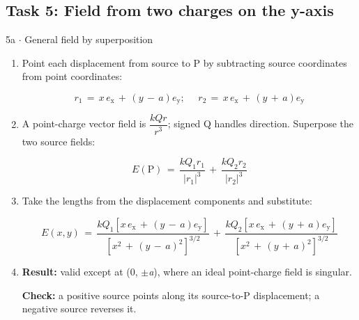 \documentclass[11pt]{article}
\begin{document}
\begin{keepsection}\subsection{Task 5: Field from two charges on the y-axis}

\begin{workedbox}{5a \ensuremath{\cdot} General field by superposition}
\begin{enumerate}
\item {}
Point each displacement from source to P by subtracting source coordinates from point coordinates:

\begin{equation*}{r}_{1}\, =\, {x\,e}_{\mathrm{x}}\, +\, ({y}\, -\, {a}){e}_{\mathrm{y}};\, \quad \, {r}_{2}\, =\, {x\,e}_{\mathrm{x}}\, +\, ({y}\, +\, {a}){e}_{\mathrm{y}}\end{equation*}
\item {}
A point-charge vector field is {\small\ensuremath{\dfrac{{kQ}{r}}{{r}^{3}}}}; signed Q handles direction. Superpose the two source fields:

\begin{equation*}{E}(\mathrm{P})\, =\, \dfrac{{kQ}_{1}{r}_{1}}{|{r}_{1}|^{3}}\, +\, \dfrac{{kQ}_{2}{r}_{2}}{|{r}_{2}|^{3}}\end{equation*}
\item {}
Take the lengths from the displacement components and substitute:

\begin{equation*}{E}({x},{y})\, =\, \dfrac{{kQ}_{1}[{x\,e}_{\mathrm{x}}\, +\, ({y}\, -\, {a}){e}_{\mathrm{y}}]}{[{x}^{2}\, +\, ({y}\, -\, {a})^{2}]^{3/2}}\, +\, \dfrac{{kQ}_{2}[{x\,e}_{\mathrm{x}}\, +\, ({y}\, +\, {a}){e}_{\mathrm{y}}]}{[{x}^{2}\, +\, ({y}\, +\, {a})^{2}]^{3/2}}\end{equation*}
\item {}
\textbf{Result:} valid except at (0, \ensuremath{\pm}\textit{a}), where an ideal point-charge field is singular.

\textbf{Check:} a positive source points along its source-to-P displacement; a negative source reverses it.
\end{enumerate}
\end{workedbox}

\end{keepsection}
\end{document}
